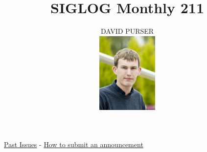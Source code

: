 \documentclass[prodmode,acmtecs]{acmsmall} %
\newcounter{colstart}
\begin{document}
\setcounter{colstart}{\thepage}

\title{\huge\sc SIGLOG Monthly 211}
\author{DAVID PURSER
\vspace*{-2.6cm}\begin{flushright}\includegraphics[width=30mm]{dp}\end{flushright}
}

\maketitlee

\href{https://lics.siglog.org/newsletters/}{Past Issues}
 - 
\href{https://lics.siglog.org/newsletters/inst.html}{How to submit an announcement}
\end{document}
